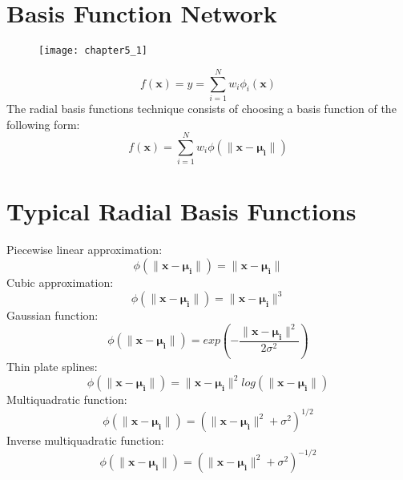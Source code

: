 \section{Basis Function Network}
\begin{figure}[h]
\centering
\texttt{[image: chapter5\_1]}
\end{figure}
$$f(\mathbf{x}) = y = \sum_{i=1}^{N} w_i \phi_i(\mathbf{x})$$
The radial basis functions technique consists of choosing a basis function of the following form:
$$f(\mathbf{x}) = \sum_{i=1}^{N} w_i \phi(\| \mathbf{\mathbf{x-\mu_{i}}}\|)$$

\section{Typical Radial Basis Functions}
Piecewise linear approximation:
$$\phi(\| \mathbf{x} - \pmb{\mu_{i}}\|) = \| \mathbf{x} - \pmb{\mu_{i}} \|$$
Cubic approximation:
$$\phi(\| \mathbf{x} - \pmb{\mu_{i}}\|) = \| \mathbf{x} - \pmb{\mu_{i}} \|^{3}$$
Gaussian function:
$$\phi(\| \mathbf{x} - \pmb{\mu_{i}}\|) = exp(-\frac{\| \mathbf{x} - \pmb{\mu_{i}} \|^{2}}{2 \sigma^{2}})$$
Thin plate splines:
$$\phi(\| \mathbf{x} - \pmb{\mu_{i}}\|) = \| \mathbf{x} - \pmb{\mu_{i}} \|^{2} log(\| \mathbf{x} - \pmb{\mu_{i}} \|)$$
Multiquadratic function:
$$\phi(\| \mathbf{x} - \pmb{\mu_{i}}\|) = (\| \mathbf{x} - \pmb{\mu_{i}} \|^{2} + \sigma^{2})^{1/2}$$
Inverse multiquadratic function:
$$\phi(\| \mathbf{x} - \pmb{\mu_{i}}\|) = (\| \mathbf{x} - \pmb{\mu_{i}} \|^{2} + \sigma^{2})^{-1/2}$$

